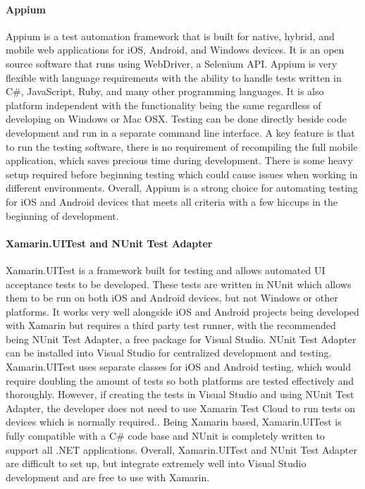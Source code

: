 \documentclass[onecolumn, draftclsnofoot,10pt, compsoc]{IEEEtran}
\begin{document}
\paragraph{Appium}
Appium is a test automation framework that is built for native, hybrid, and mobile web applications for  iOS, Android, and Windows devices. It is an open source software that runs using WebDriver, a Selenium API.
Appium is very flexible with language requirements with the ability to handle tests written in C\#, JavaScript, Ruby, and many other programming languages. It is also platform independent with the functionality being
the same regardless of developing on Windows or Mac OSX. Testing can be done directly beside code development and run in a separate command line interface. A key feature is that to  run the testing software, there is 
no requirement of recompiling the full mobile application, which saves precious time during development. There is some heavy setup required before beginning testing which could cause issues when working in different environments.
Overall, Appium is a strong choice for automating testing for iOS and Android devices that meets all criteria with a few hiccups in the beginning of development.

\paragraph{Xamarin.UITest and NUnit Test Adapter}

Xamarin.UITest is a framework built for testing and allows automated UI acceptance tests to be developed. These tests are written in NUnit which allows them to be run on both iOS and Android devices, but not Windows 
or other platforms. It works very well alongside iOS and Android projects being developed with Xamarin but requires a third party test runner, with the recommended being NUnit Test Adapter, a free package for Visual 
Studio. NUnit Test Adapter can be installed into Visual Studio for centralized development and testing. Xamarin.UITest uses separate classes for iOS and  Android testing, which would require doubling the amount of tests
so both platforms are tested effectively and thoroughly. However, if creating the tests in Visual Studio and using NUnit Test Adapter, the  developer does not need to use Xamarin Test Cloud to run tests on devices 
which is normally  required.. Being Xamarin based, Xamarin.UITest is fully compatible with a C\# code base and NUnit is  completely written to support all .NET applications. 
Overall, Xamarin.UITest and NUnit Test Adapter are difficult to set up, but integrate extremely well into Visual Studio development and are free to use with Xamarin.
\end{document}
